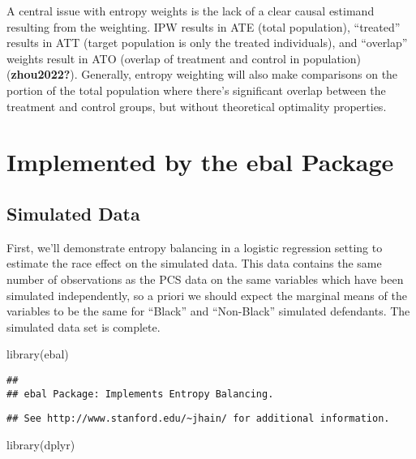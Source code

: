 \documentclass[
  letterpaper,
  DIV=11,
  numbers=noendperiod]{scrartcl}
\newenvironment{Shaded}{\begin{snugshade}}{\end{snugshade}}
\newcommand{\FunctionTok}[1]{\textcolor[rgb]{0.28,0.35,0.67}{#1}}
\newcommand{\NormalTok}[1]{\textcolor[rgb]{0.00,0.23,0.31}{#1}}
\begin{document}
A central issue with entropy weights is the lack of a clear causal
estimand resulting from the weighting. IPW results in ATE (total
population), ``treated'' results in ATT (target population is only the
treated individuals), and ``overlap'' weights result in ATO (overlap of
treatment and control in population) (\textbf{zhou2022?}). Generally,
entropy weighting will also make comparisons on the portion of the total
population where there's significant overlap between the treatment and
control groups, but without theoretical optimality properties.

\hypertarget{implemented-by-the-ebal-package}{%
\section{Implemented by the ebal
Package}\label{implemented-by-the-ebal-package}}

\hypertarget{simulated-data}{%
\subsection{Simulated Data}\label{simulated-data}}

First, we'll demonstrate entropy balancing in a logistic regression
setting to estimate the race effect on the simulated data. This data
contains the same number of observations as the PCS data on the same
variables which have been simulated independently, so a priori we should
expect the marginal means of the variables to be the same for ``Black''
and ``Non-Black'' simulated defendants. The simulated data set is
complete.

\begin{Shaded}
\begin{Highlighting}[]
\FunctionTok{library}\NormalTok{(ebal)}
\end{Highlighting}
\end{Shaded}

\begin{verbatim}
##
## ebal Package: Implements Entropy Balancing.
\end{verbatim}

\begin{verbatim}
## See http://www.stanford.edu/~jhain/ for additional information.
\end{verbatim}

\begin{Shaded}
\begin{Highlighting}[]
\FunctionTok{library}\NormalTok{(dplyr)}
\end{Highlighting}
\end{Shaded}
\end{document}
